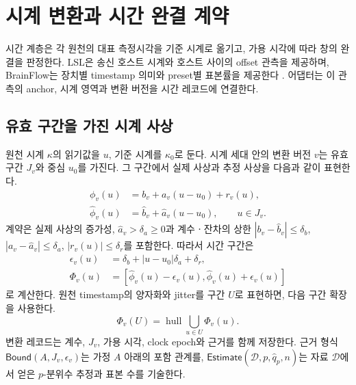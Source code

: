\section{시계 변환과 시간 완결 계약}
\label{sec:time}

시간 계층은 각 원천의 대표 측정시각을 기준 시계로 옮기고, 가용 시각에 따라
창의 완결을 판정한다. LSL은 송신 호스트 시계와 호스트 사이의 offset 관측을 제공하며,
BrainFlow는 장치별 timestamp 의미와 preset별 표본률을 제공한다
\citep{lsl_time,brainflow_data}. 어댑터는 이 관측의 anchor, 시계 영역과 변환 버전을
시간 레코드에 연결한다.

\subsection{유효 구간을 가진 시계 사상}

원천 시계 $\kappa$의 읽기값을 $u$, 기준 시계를 $\kappa_0$로 둔다.
시계 세대 안의 변환 버전 $v$는 유효 구간 $J_v$와 중심 $u_0$를 가진다.
그 구간에서 실제 사상과 추정 사상을 다음과 같이 표현한다.
\begin{equation}
 \begin{aligned}
 \phi_v(u)&=b_v+a_v(u-u_0)+r_v(u),\\
 \widehat\phi_v(u)&=\widehat b_v+\widehat a_v(u-u_0),\qquad u\in J_v.
 \end{aligned}
 \label{eq:clock-affine}
\end{equation}
계약은 실제 사상의 증가성, $\widehat a_v>\delta_a\ge0$과 계수ㆍ잔차의 상한
$|b_v-\widehat b_v|\le\delta_b$,
$|a_v-\widehat a_v|\le\delta_a$,
$|r_v(u)|\le\delta_r$를 포함한다. 따라서 시간 구간은
\begin{equation}
 \begin{aligned}
 \epsilon_v(u)&=\delta_b+|u-u_0|\delta_a+\delta_r,\\
 \Phi_v(u)&=[\widehat\phi_v(u)-\epsilon_v(u),
                  \widehat\phi_v(u)+\epsilon_v(u)]
 \end{aligned}
 \label{eq:clock-interval}
\end{equation}
로 계산한다. 원천 timestamp의 양자화와 jitter를 구간 $U$로 표현하면,
다음 구간 확장을 사용한다.
\begin{equation}
 \Phi_v(U)=\operatorname{hull}\!\bigcup_{u\in U}\Phi_v(u).
 \label{eq:clock-interval-extension}
\end{equation}
변환 레코드는 계수, $J_v$, 가용 시각, clock epoch와 근거를 함께 저장한다.
근거 형식 $\mathsf{Bound}(A,J_v,\epsilon_v)$는 가정 $A$ 아래의 포함 관계를,
$\mathsf{Estimate}(\mathcal D,p,\widehat q_p,n)$는 자료 $\mathcal D$에서 얻은
$p$-분위수 추정과 표본 수를 기술한다.

